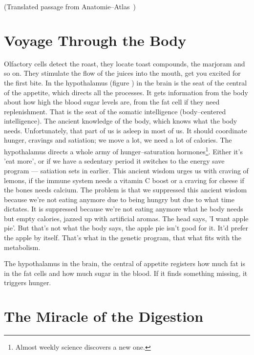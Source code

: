 \documentclass[../main.tex]{subfiles}
\begin{document}
(Translated passage from Anatomie--Atlas~\cite{AAtlas})
\section{Voyage Through the Body}
Olfactory cells detect the roast, they locate toast compounds, the marjoram and so on.
They stimulate the flow of the juices into the mouth, get you excited for the first bite.
In the hypothalamus (figure%
) in the brain is the seat of the central of the appetite, which directs all the processes.
It gets information from the body about how high the blood sugar levels are, from the fat cell if they need replenishment.
That is the seat of the somatic intelligence (body--centered intelligence).
The ancient knowledge of the body, which knows what the body needs.
Unfortunately, that part of us is asleep in most of us.
It should coordinate hunger, cravings and satiation; we move a lot, we need a lot of calories.
The hypothalamus directs a whole army of hunger--saturation hormones\footnote{Almost weekly science discovers a new one.}.
Either it's 'eat more', or if we have a sedentary period it switches to the energy save program --- satiation sets in earlier.
This ancient wisdom urges us with craving of lemons, if the immune system needs a vitamin C boost or a craving for cheese if the bones needs calcium.
The problem is that we suppressed this ancient wisdom because we're not eating anymore due to being hungry but due to what time dictates.
It is suppressed because we're not eating anymore what he body needs but empty calories, jazzed up with artificial aromas.
The head says, 'I want apple pie'. But that's not what the body says, the apple pie isn't good for it. It'd prefer the apple by itself.
That's what in the genetic program, that what fits with the metabolism.

The hypothalamus in the brain, the central of appetite registers how much fat is in the fat cells and how much sugar in the blood.
If it finds something missing, it triggers hunger.

\section{The Miracle of the Digestion}
\end{document}
